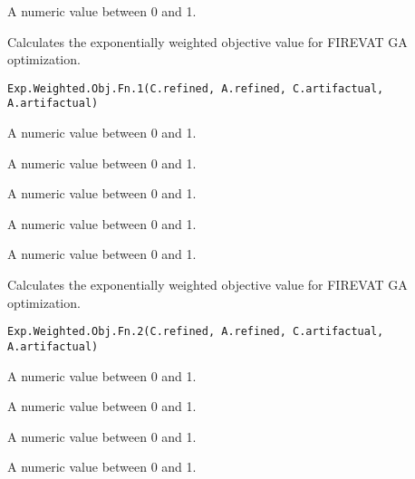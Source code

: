 \documentclass[letterpaper]{book}
\begin{document}
%
\begin{Value}
A numeric value between 0 and 1.
\end{Value}
%
\begin{Description}\relax
Calculates the exponentially weighted objective value
for FIREVAT GA optimization.
\end{Description}
%
\begin{Usage}
\begin{verbatim}
Exp.Weighted.Obj.Fn.1(C.refined, A.refined, C.artifactual, A.artifactual)
\end{verbatim}
\end{Usage}
%
\begin{Arguments}
\begin{ldescription}
\item[\code{C.refined}] A numeric value between 0 and 1.

\item[\code{A.refined}] A numeric value between 0 and 1.

\item[\code{C.artifactual}] A numeric value between 0 and 1.

\item[\code{A.artifactual}] A numeric value between 0 and 1.
\end{ldescription}
\end{Arguments}
%
\begin{Value}
A numeric value between 0 and 1.
\end{Value}
%
\begin{Description}\relax
Calculates the exponentially weighted objective value
for FIREVAT GA optimization.
\end{Description}
%
\begin{Usage}
\begin{verbatim}
Exp.Weighted.Obj.Fn.2(C.refined, A.refined, C.artifactual, A.artifactual)
\end{verbatim}
\end{Usage}
%
\begin{Arguments}
\begin{ldescription}
\item[\code{C.refined}] A numeric value between 0 and 1.

\item[\code{A.refined}] A numeric value between 0 and 1.

\item[\code{C.artifactual}] A numeric value between 0 and 1.

\item[\code{A.artifactual}] A numeric value between 0 and 1.
\end{ldescription}
\end{Arguments}
\end{document}
